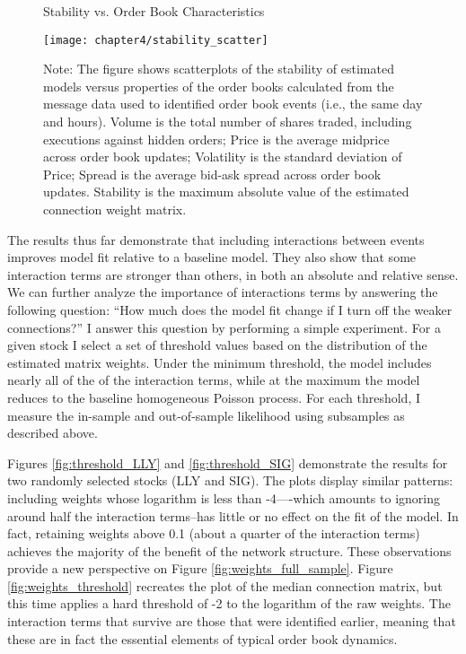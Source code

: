 		\begin{figure}[p]
			\small
			\linespread{1}
			\centering
			\captionsetup{labelsep=colon, font=footnotesize, justification=centerfirst, width=\linewidth}
			\caption{Stability vs. Order Book Characteristics}
			\label{fig:stability_scatter}
			\texttt{[image: chapter4/stability\_scatter]}
			\captionsetup{position=below, font=footnotesize, justification=justified, width=\linewidth}
			\caption*{Note: The figure shows scatterplots of the stability of estimated models versus properties of the order books calculated from the message data used to identified order book events (i.e., the same day and hours). Volume is the total number of shares traded, including executions against hidden orders; Price is the average midprice across order book updates; Volatility is the standard deviation of Price; Spread is the average bid-ask spread across order book updates. Stability is the maximum absolute value of the estimated connection weight matrix.}
		\end{figure}


		The results thus far demonstrate that including interactions between events improves model fit relative to a baseline model. They also show that some interaction terms are stronger than others, in both an absolute and relative sense. We can further analyze the importance of interactions terms by answering the following question: “How much does the model fit change if I turn off the weaker connections?” I answer this question by performing a simple experiment. For a given stock I select a set of threshold values based on the distribution of the estimated matrix weights. Under the minimum threshold, the model includes nearly all of the of the interaction terms, while at the maximum the model reduces to the baseline homogeneous Poisson process. For each threshold, I measure the in-sample and out-of-sample likelihood using subsamples as described above.

		Figures \ref{fig:threshold_LLY} and \ref{fig:threshold_SIG} demonstrate the results for two randomly selected stocks (LLY and SIG). The plots display similar patterns: including weights whose logarithm is less than -4—-which amounts to ignoring around half the interaction terms--has little or no effect on the fit of the model. In fact, retaining weights above 0.1 (about a quarter of the interaction terms) achieves the majority of the benefit of the network structure. These observations provide a new perspective on Figure \ref{fig:weights_full_sample}. Figure \ref{fig:weights_threshold} recreates the plot of the median connection matrix, but this time applies a hard threshold of -2 to the logarithm of the raw weights. The interaction terms that survive are those that were identified earlier, meaning that these are in fact the essential elements of typical order book dynamics.

